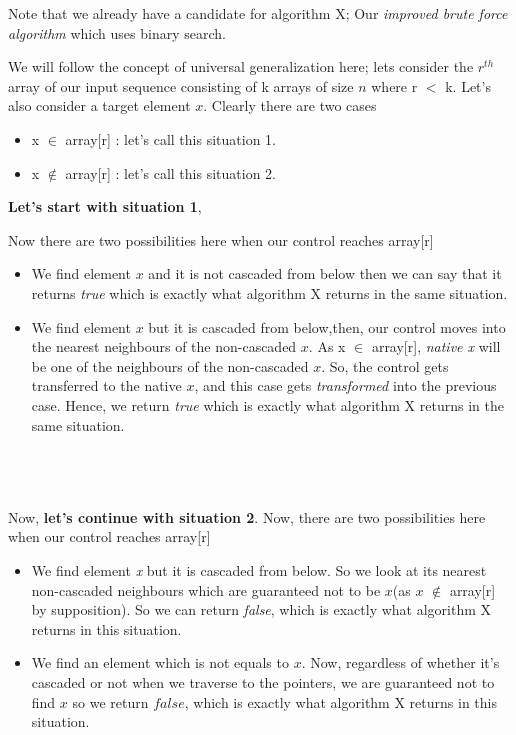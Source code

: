 \documentclass[11pt]{article}
\begin{document}
Note that we already have a candidate for algorithm X; Our \textit{improved brute force algorithm} which uses binary search.


We will follow the concept of universal generalization here; lets consider the $r^{th}$ array of our input sequence consisting of k arrays of size $n$ where r $<$ k. Let's also consider a target element $x$. Clearly there are two cases
\begin{itemize}
    \item x $\in$ array[r] : let's call this situation 1.
     \item x $\notin$ array[r] : let's call this situation 2.
\end{itemize}

\textbf{Let's start with situation 1}, 

Now there are two possibilities here when our control reaches array[r] 
\begin{itemize}
    \item We find element $x$ and it is not cascaded from below then we can say that it returns \textit{true} which is exactly what algorithm X returns in the same situation.
    \item We find element $x$ but it is cascaded from below,then, our control moves into the nearest neighbours of the non-cascaded $x$. As x $\in$ array[r], \textit{native x} will be one of the neighbours of the non-cascaded $x$. So, the control gets transferred to the native $x$, and this case gets \textit{transformed} into the previous case. Hence, we return \textit{true} which is exactly what algorithm X returns in the same situation.
\end{itemize} \\ \\ \\
Now, \textbf{let's continue with situation 2}.
Now, there are two possibilities here when our control reaches array[r] 

\begin{itemize}
    \item We find element \textit{x} but it is cascaded from below. So we look at its nearest non-cascaded neighbours which are guaranteed not to be $x$(as $x$ $\notin$ array[r] by supposition). So we can return \textit{false}, which is exactly what algorithm X returns in this situation.
    \item We find an element which is not equals to $x$. Now, regardless of whether it's cascaded or not when we traverse to the pointers, we are guaranteed not to find $x$ so we return $false$, which is exactly what algorithm X returns in this situation.
\end{itemize}
\end{document}
